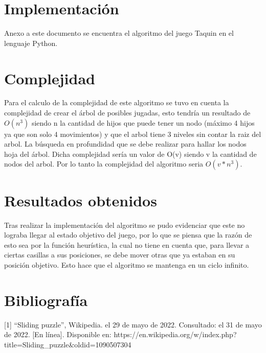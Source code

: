 \documentclass[a4paper]{article}
\theoremstyle{plain}
\theoremstyle{definition}
\begin{document}
    \section{Implementación}
    \hspace{1mm}
    Anexo a este documento se encuentra el algoritmo del juego Taquin en el lenguaje Python. 
	
    \section{Complejidad}
    \hspace{1mm}
    Para el calculo de la complejidad de este algoritmo se tuvo en cuenta la complejidad de crear el árbol de posibles jugadas, esto tendría un resultado de $O(n^3)$ siendo n la cantidad de hijos que puede tener un nodo (máximo 4 hijos ya que son solo 4 movimientos) y que el arbol tiene 3 niveles sin contar la raiz del arbol. La búsqueda en profundidad que se debe realizar para hallar los nodos hoja del árbol. Dicha complejidad sería un valor de O(v) siendo v la cantidad de nodos del arbol. Por lo tanto la complejidad del algoritmo seria $O(v*n^3)$.
  
    \section{Resultados obtenidos}
    \hspace{1mm}
    Tras realizar la implementación del algoritmo se pudo evidenciar que este no lograba llegar al estado objetivo del juego, por lo que se piensa que la razón de esto sea por la función heurística, la cual no tiene en cuenta que, para llevar a ciertas casillas a sus posiciones, se debe mover otras que ya estaban en su posición objetivo. Esto hace que el algoritmo se mantenga en un ciclo infinito.
    \section{Bibliografía}
	\hspace{1cm}
	
	[1] “Sliding puzzle”, Wikipedia. el 29 de mayo de 2022. Consultado: el 31 de mayo de 2022. [En línea]. Disponible en: https://en.wikipedia.org/w/index.php?title=Sliding_puzzle&oldid=1090507304
	
	
	
\end{document}
